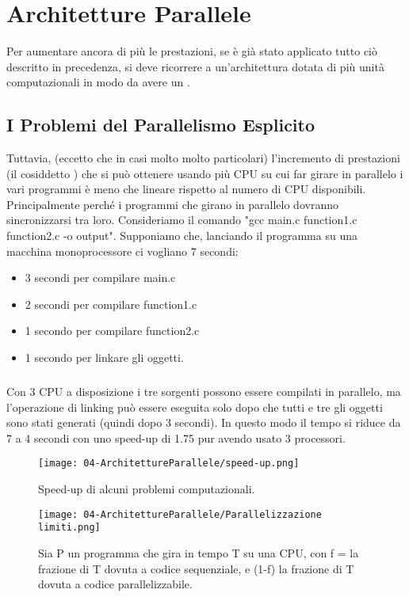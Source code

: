 \chapter{Architetture Parallele}

Per aumentare ancora di più le prestazioni, se è già stato applicato tutto ciò descritto in precedenza, si deve ricorrere a un'architettura dotata di più unità computazionali in modo da avere un . 


\section{I Problemi del Parallelismo Esplicito}

Tuttavia, (eccetto che in casi molto molto particolari) l’incremento di
prestazioni (il cosiddetto ) che si può ottenere usando più
CPU su cui far girare in parallelo i vari programmi è meno che
lineare rispetto al numero di CPU disponibili. Principalmente perché i programmi che girano in parallelo dovranno sincronizzarsi tra loro. Consideriamo il comando "gcc main.c function1.c function2.c -o output". Supponiamo che, lanciando il programma su una macchina monoprocessore ci vogliano 7 secondi: 

\begin{itemize}
  \item 3 secondi per compilare main.c 
  \item 2 secondi per compilare function1.c 
  \item 1 secondo per compilare function2.c 
  \item 1 secondo per linkare gli oggetti. 
\end{itemize}

\paragraph{}
Con 3 CPU a disposizione i tre sorgenti possono essere compilati in parallelo, ma l'operazione di linking può essere eseguita solo dopo che tutti e tre gli oggetti sono stati generati (quindi dopo 3 secondi). In questo modo il tempo si riduce da 7 a 4 secondi con uno speed-up di 1.75 pur avendo usato 3 processori.
\begin{figure}[h]
    \centering
    \texttt{[image: 04-ArchitettureParallele/speed-up.png]}
    \caption{Speed-up di alcuni problemi computazionali.}
\end{figure}
\pagebreak
\begin{figure}[!h]
    \centering
    \texttt{[image: 04-ArchitettureParallele/Parallelizzazione limiti.png]}
    \caption{Sia P un programma che gira in tempo T su una CPU, con f = la
frazione di T dovuta a codice sequenziale, e (1-f) la frazione di T
dovuta a codice parallelizzabile.}
\end{figure}

